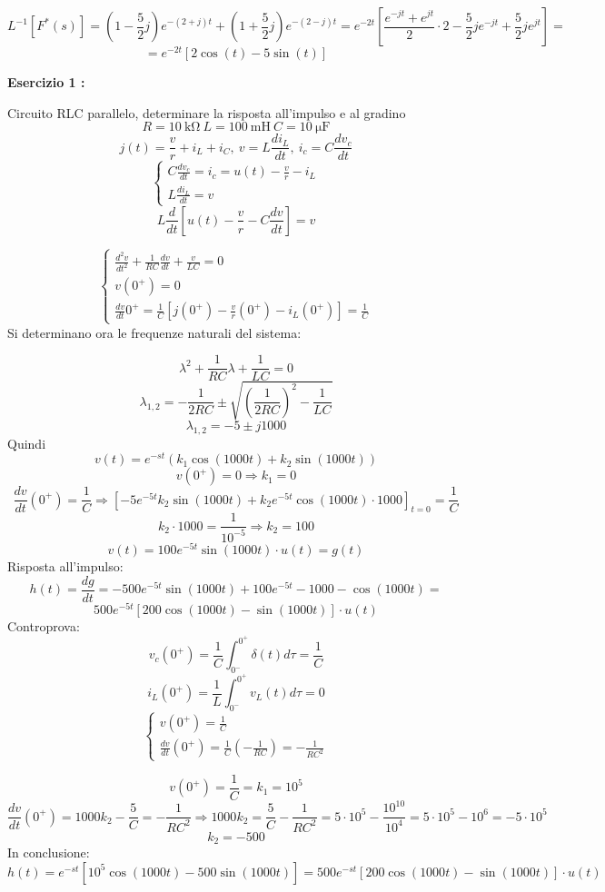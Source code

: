 $$
L^{-1}[F^*(s)] = (1-\frac{5}{2}j)e^{-(2+j)t} + (1+\frac{5}{2}j)e^{-(2-j)t} = e^{-2t}\left[\frac{e^{-jt}+e^{jt}}{2}\cdot 2 - \frac{5}{2}je^{-jt}+\frac{5}{2}je^{jt}\right] =
$$
$$
= e^{-2t}\left[2\cos(t)-5\sin(t)\right]
$$

\textbf{Esercizio 1 :}

Circuito RLC parallelo, determinare la risposta all'impulso e al gradino
$$
R = \SI{10}{\kilo\ohm}\ L = \SI{100}{\milli\henry}\ C = \SI{10}{\micro\farad}
$$
$$
j(t) = \frac{v}{r} + i_L + i_C,\ v = L\frac{di_L}{dt},\ i_c = C\frac{dv_c}{dt}
$$
$$\begin{cases}
C\frac{dv_c}{dt} = i_c = u(t) -\frac{v}{r} - i_L\\
L\frac{di_L}{dt} = v
\end{cases}
$$
$$
L\frac{d}{dt}\left[u(t) -\frac{v}{r} - C \frac{dv}{dt}\right] = v
$$

$$
\begin{cases}
\frac{d^2v}{dt^2} + \frac{1}{RC}\frac{dv}{dt} + \frac{v}{LC} = 0\\
v(0^+)=0\\
\frac{dv}{dt}0^+ = \frac{1}{C}\left[j(0^+) - \frac{v}{r}(0^+) - i_L(0^+)\right] = \frac{1}{C}
\end{cases}
$$
Si determinano ora le frequenze naturali del sistema:

$$
\lambda^2 + \frac{1}{RC}\lambda + \frac{1}{LC} = 0
$$
$$
\lambda_{1,2} = -\frac{1}{2RC} \pm \sqrt{\left(\frac{1}{2RC}\right)^2-\frac{1}{LC}}
$$
$$
\lambda_{1,2} = -5 \pm j 1000
$$
Quindi 
$$
v(t) = e^{-st}(k_1\cos(1000t)+k_2\sin(1000t))
$$
$$
v(0^+) = 0 \Rightarrow k_1 = 0
$$
$$
\frac{dv}{dt}(0^+) = \frac{1}{C} \Rightarrow \left[-5e^{-5t}k_2\sin(1000t) + k_2e^{-5t}\cos(1000t)\cdot1000\right]_{t=0} = \frac{1}{C}
$$
$$
k_2\cdot1000 = \frac{1}{10^{-5}} \Rightarrow k_2 = 100
$$
$$
v(t) = 100e^{-5t}\sin(1000t)\cdot u(t) = g(t)
$$
Risposta all'impulso:
$$
h(t) = \frac{dg}{dt} = -500e^{-5t}\sin(1000t) + 100e^{-5t}-1000-\cos(1000t) = 
$$
$$
500e^{-5t}\left[200\cos(1000t)-\sin(1000t)\right]\cdot u(t)
$$
Controprova:
$$
v_c(0^+) = \frac{1}{C}\int_{0^-}^{0^+}\delta(t)d\tau = \frac{1}{C}
$$
$$
i_L(0^+) = \frac{1}{L}\int_{0^-}^{0^+} v_L(t)d\tau = 0
$$
$$
\begin{cases}
v(0^+) = \frac{1}{C}\\
\frac{dv}{dt}(0^+) = \frac{1}{C}\left(-\frac{1}{RC}\right) = -\frac{1}{RC^2}
\end{cases}
$$

$$
v(0^+) = \frac{1}{C} = k_1 = 10^5
$$
$$
\frac{dv}{dt}(0^+) = 1000k_2 - \frac{5}{C} = -\frac{1}{RC^2} \Rightarrow 1000k_2 = \frac{5}{C} - \frac{1}{RC^2} = 5\cdot10^5 - \frac{10^10}{10^4} = 5\cdot10^5-10^6 = -5\cdot10^5
$$
$$
k_2 = -500
$$
In conclusione:
$$
h(t) = e^{-st}\left[10^5\cos(1000t)-500\sin(1000t)\right] = 500e^{-st}\left[200\cos(1000t)-\sin(1000t)\right]\cdot u(t)
$$

